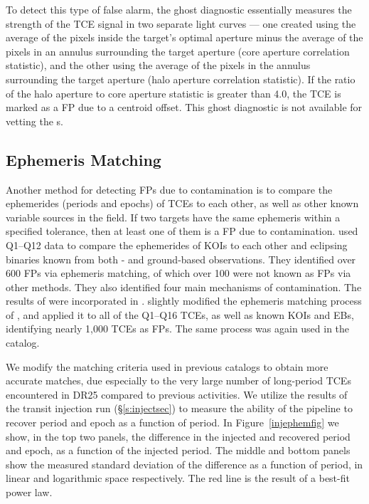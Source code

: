To detect this type of false alarm, the ghost diagnostic essentially measures the strength of the TCE signal in two separate light curves --- one created using the average of the pixels inside the target's optimal aperture minus the average of the pixels in an annulus surrounding the target aperture (core aperture correlation statistic), and the other using the average of the pixels in the annulus surrounding the target aperture (halo aperture correlation statistic). If the ratio of the halo aperture to core aperture statistic is greater than 4.0, the TCE is marked as a FP due to a centroid offset. This ghost diagnostic is not available for vetting the \scrtce s. 


\subsection{Ephemeris Matching}
\label{ephemmatchsec}
\label{s:ephemmatch}

Another method for detecting FPs due to contamination is to compare the ephemerides (periods and epochs) of TCEs to each other, as well as other known variable sources in the \kepler{} field. If two targets have the same ephemeris within a specified tolerance, then at least one of them is a FP due to contamination. \citet{Coughlin2014a} used Q1--Q12 data to compare the ephemerides of KOIs to each other and eclipsing binaries known from both \kepler{}- and ground-based observations. They identified over 600 FPs via ephemeris matching, of which over 100 were not known as FPs via other methods. They also identified four main mechanisms of contamination. The results of \citet{Coughlin2014a} were incorporated in \citet[][see \S3.3]{Rowe2015a}. \citet[][see \S5.3]{Mullally2015cat} slightly modified the ephemeris matching process of \citet{Coughlin2014a}, and applied it to all of the Q1--Q16 TCEs, as well as known KOIs and EBs, identifying nearly 1,000 TCEs as FPs. The same process was again used in the \citet{Coughlin2016} catalog.

We modify the matching criteria used in previous catalogs to obtain more accurate matches, due especially to the very large number of long-period TCEs encountered in DR25 compared to previous activities. We utilize the results of the transit injection run (\S\ref{s:injectsec}) to measure the ability of the \kepler{} pipeline to recover period and epoch as a function of period. In Figure~\ref{injephemfig} we show, in the top two panels, the difference in the injected and recovered period and epoch, as a function of the injected period. The middle and bottom panels show the measured standard deviation of the difference as a function of period, in linear and logarithmic space respectively. The red line is the result of a best-fit power law.

